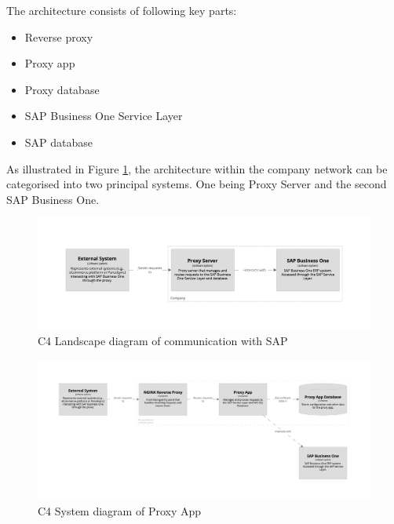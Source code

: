 The architecture consists of following key parts:
\begin{itemize}
    \item Reverse proxy
    \item Proxy app
    \item Proxy database
    \item SAP Business One Service Layer
    \item SAP database
\end{itemize}

As illustrated in Figure \ref{img07:structurizr:landscape}, the architecture within the company network can be categorised into two principal systems. One being Proxy Server and the second SAP Business One.

\begin{figure}[p]\centering
\includegraphics[width=140mm]{img/chap07/fig_structurizr-landscape.png}
\caption{C4 Landscape diagram of communication with SAP}
\label{img07:structurizr:landscape}
\end{figure}

\begin{figure}[p]\centering
\includegraphics[width=140mm]{img/chap07/fig_structurizr-proxy-system.png}
\caption{C4 System diagram of Proxy App}
\label{img07:structurizr:system:proxy}
\end{figure}

